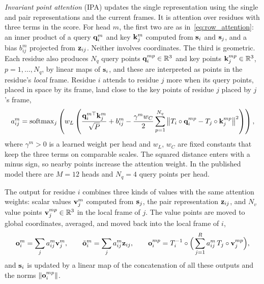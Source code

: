 \emph{Invariant point attention} (IPA) updates the single representation using the single and pair representations and the current frames. It is attention over residues with three terms in the score. For head $m$, the first two are as in~\eqref{eq:row_attention}: an inner product of a query $\mathbf{q}^m_i$ and key $\mathbf{k}^m_j$ computed from $\mathbf{s}_i$ and $\mathbf{s}_j$, and a bias $b^m_{ij}$ projected from $\mathbf{z}_{ij}$. Neither involves coordinates. The third is geometric. Each residue also produces $N_q$ query points $\mathbf{q}^{mp}_i\in\mathbb{R}^3$ and key points $\mathbf{k}^{mp}_j\in\mathbb{R}^3$, $p=1,\dots,N_q$, by linear maps of $\mathbf{s}_i$, and these are interpreted as points in the residue's \emph{local} frame. Residue $i$ attends to residue $j$ more when its query points, placed in space by its frame, land close to the key points of residue $j$ placed by $j$'s frame,
\begin{equation}
  a^m_{ij} = \operatorname{softmax}_j\left( w_L\left( \frac{\mathbf{q}^{m\top}_i\mathbf{k}^m_j}{\sqrt{P}} + b^m_{ij} - \frac{\gamma^m w_C}{2}\sum_{p=1}^{N_q}\big\|T_i\circ\mathbf{q}^{mp}_i - T_j\circ\mathbf{k}^{mp}_j\big\|^2 \right)\right),
  \label{eq:ipa}
\end{equation}
where $\gamma^m>0$ is a learned weight per head and $w_L$, $w_C$ are fixed constants that keep the three terms on comparable scales. The squared distance enters with a minus sign, so nearby points increase the attention weight. In the published model there are $M=12$ heads and $N_q=4$ query points per head.

The output for residue $i$ combines three kinds of values with the same attention weights: scalar values $\mathbf{v}^m_j$ computed from $\mathbf{s}_j$, the pair representation $\mathbf{z}_{ij}$, and $N_v$ value points $\mathbf{v}^{mp}_j\in\mathbb{R}^3$ in the local frame of $j$. The value points are moved to global coordinates, averaged, and moved back into the local frame of $i$,
\begin{equation}
  \mathbf{o}^{m}_i=\sum_j a^m_{ij}\mathbf{v}^m_j, \qquad
  \tilde{\mathbf{o}}^{m}_i=\sum_j a^m_{ij}\mathbf{z}_{ij}, \qquad
  \mathbf{o}^{mp}_i = T_i^{-1}\circ\Big(\sum_{j=1}^R a^m_{ij}\, T_j\circ\mathbf{v}^{mp}_j\Big),
  \label{eq:ipa_out}
\end{equation}
and $\mathbf{s}_i$ is updated by a linear map of the concatenation of all these outputs and the norms $\|\mathbf{o}^{mp}_i\|$.


